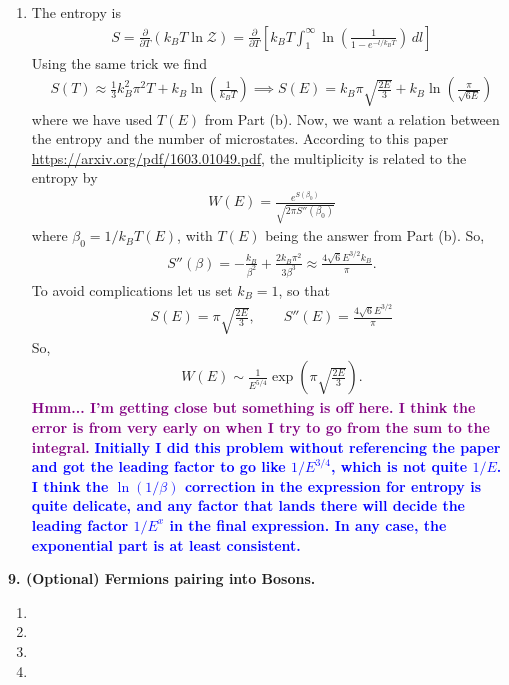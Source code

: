 \documentclass{article}
\theoremstyle{definition}
\newcommand{\p}{\partial}
\newcommand{\be}{\beta}
\newcommand{\f}[2]{\frac{#1}{#2}}
\newcommand{\lp}{\left(}
\newcommand{\rp}{\right)}
\newcommand{\lb}{\left[}
\newcommand{\rb}{\right]}
\begin{document}
\begin{enumerate}[label=(\alph*)]
	
	\item The entropy is 
	\begin{align*}
	S = \f{\p }{\p T} (k_B T \ln \mathcal{Z}) = \f{\p}{\p T}\lb k_B T \int_{1}^\infty \ln \lp \f{1}{1 - e^{- l/k_B T}}  \rp \,dl \rb 
	\end{align*}
	Using the same trick we find 
	\begin{align*}
	S(T) \approx \f{1}{3}k_B^2 \pi^2 T + k_B \ln \lp \f{1}{k_B T}\rp \implies S(E) = k_B \pi\sqrt{\f{2E}{3}} + k_B \ln\lp \f{\pi}{\sqrt{6E}} \rp
	\end{align*}
	where we have used $T(E)$ from Part (b). Now, we want a relation between the entropy and the number of microstates. According to this paper \href{https://arxiv.org/pdf/1603.01049.pdf}{https://arxiv.org/pdf/1603.01049.pdf}, the multiplicity is related to the entropy by 
	\begin{align*}
	W(E) = \f{e^{S(\be_0)}}{\sqrt{2\pi S''(\be_0)}}
	\end{align*}
	where $\be_0 = 1/k_B T(E)$, with $T(E)$ being the answer from Part (b). So,
	\begin{align*}
	S''(\be) =-\f{k_B}{\be^2} + \f{2k_B \pi^2}{3\be^3} \approx \f{4\sqrt{6} E^{3/2} k_B}{\pi }.
	\end{align*}
	To avoid complications let us set $k_B = 1$, so that 
	\begin{align*}
	S(E) = \pi \sqrt{\f{2E}{3}}, \quad\quad S''(E) = \f{4\sqrt{6} E^{3/2}}{\pi}
	\end{align*}
	So, 
	\begin{align*}
	W(E) \sim \f{1}{E^{5/4}} \exp\lp \pi \sqrt{\f{2E}{3}} \rp.
	\end{align*}
	\textbf{\textcolor{purple}{Hmm... I'm getting close but something is off here. I think the error is from very early on when I try to go from the sum to the integral.}} \textbf{\textcolor{blue}{Initially I did this problem without referencing the paper and got the leading factor to go like $1/E^{3/4}$, which is not quite $1/E$. I think the $\ln(1/\be)$ correction in the expression for entropy is quite delicate, and any factor that lands there will decide the leading factor $1/E^x$ in the final expression. In any case, the exponential part is at least consistent.}}
\end{enumerate}


\noindent \textbf{9. (Optional) Fermions pairing into Bosons.}

\begin{enumerate}[label=(\alph*)]
	\item 
	
	\item 
	
	\item 
	
	\item 
	
\end{enumerate}
\end{document}
